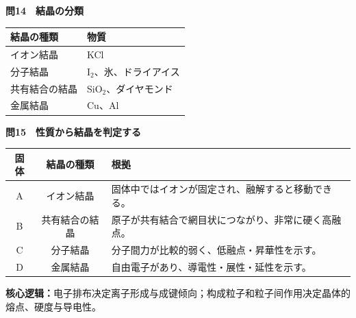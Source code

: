\documentclass[11pt,a4paper]{ctexart}
\newcommand{\qtitle}[2]{\vspace{2mm}\noindent\textcolor{JapanBlue}{\textbf{問#1　#2}}\par}
\begin{document}
\qtitle{14}{結晶の分類}
\begin{center}
\renewcommand{\arraystretch}{1.4}
\begin{tabular}{l|l}
\toprule
結晶の種類 & 物質\\ \midrule
イオン結晶 & KCl\\
分子結晶 & I$_2$、氷、ドライアイス\\
共有結合の結晶 & SiO$_2$、ダイヤモンド\\
金属結晶 & Cu、Al\\
\bottomrule
\end{tabular}
\end{center}

\qtitle{15}{性質から結晶を判定する}
\begin{tabularx}{\linewidth}{c|c|X}
\toprule
固体 & 結晶の種類 & 根拠\\ \midrule
A & イオン結晶 & 固体中ではイオンが固定され、融解すると移動できる。\\
B & 共有結合の結晶 & 原子が共有結合で網目状につながり、非常に硬く高融点。\\
C & 分子結晶 & 分子間力が比較的弱く、低融点・昇華性を示す。\\
D & 金属結晶 & 自由電子があり、導電性・展性・延性を示す。\\
\bottomrule
\end{tabularx}

\vfill
\begin{center}
\colorbox{SoftRed}{\parbox{.9\linewidth}{
\textbf{核心逻辑：}电子排布决定离子形成与成键倾向；构成粒子和粒子间作用决定晶体的熔点、硬度与导电性。
}}
\end{center}
\end{document}
